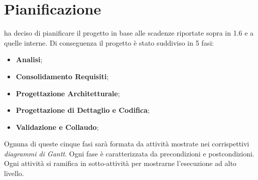 \section{Pianificazione}
\Gruppo ha deciso di pianificare il progetto in base alle scadenze riportate sopra
in 1.6 e a quelle interne. Di conseguenza il progetto è stato suddiviso in 5 fasi:
\begin{itemize}
    \item \textbf{Analisi};
    \item \textbf{Consolidamento Requisiti};
    \item \textbf{Progettazione Architetturale};
    \item \textbf{Progettazione di Dettaglio e Codifica};
    \item \textbf{Validazione e Collaudo};
\end{itemize}
Ognuna di queste cinque fasi sarà formata da attività mostrate nei corrispettivi
\textit{diagrammi di Gantt}. Ogni fase è caratterizzata da precondizioni e postcondizioni.
Ogni attività si ramifica in sotto-attività per mostrarne l'esecuzione ad alto livello.


\newpage

\newpage

\newpage

\newpage

\newpage
